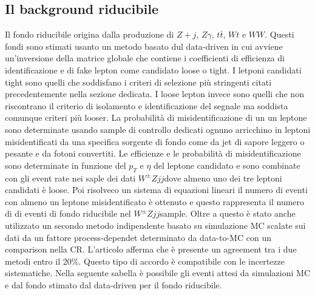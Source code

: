 \documentclass[11pt]{article}
\newcommand{\wzjj}{$W^\pm Z jj$}
\begin{document}
\subsection{Il background riducibile}
Il fondo riducibile origina dalla produzione di $Z+j$, $Z\gamma$, $t\bar{t}$, $Wt$ e $WW$. Questi fondi sono stimati usanto un metodo basato dul data-driven in cui avviene un'inversione della matrice globale che contiene i coefficienti di efficienza di identificazione e di fake lepton come candidato loose o tight. I letponi candidati tight sono quelli che soddisfano i criteri di selezione più stringenti citati precedentemente nella sezione dedicata. I loose lepton invece sono quelli che non riscontrano il criterio di isolamento e identificazione del segnale ma soddista comunque criteri più looser. La probabilità di misidentificazione di un un leptone sono determinate usando sample di controllo dedicati ognuno arricchino in leptoni misidentificati da una specifica sorgente di fondo come da jet di sapore leggero o pesante e da fotoni convertiti. Le efficienze e le probabilità di misidentificazione sono determinate in funzione del $p_T$ e $\eta$ del leptone candidato e sono combinate con gli event rate nei saple dei dati \wzjj dove almeno uno dei tre leptoni candidati è loose. Poi risolveco un sistema di equazioni lineari il numero di eventi con almeno un leptone misidentificato è ottenuto e questo rappresenta il numero di di eventi di fondo riducibile nel \wzjj sample. Oltre a questo è stato anche utilizzato un secondo metodo indipendente basato su simulazione MC scalate sui dati da un fattore  process-dependet determinato da data-to-MC con un comparison nella CR. L'articolo afferma che è presente un agreement tra i due metodi entro il 20\%. Questo tipo di accordo è compatibile con le incertezze sistematiche. Nella seguente sabella è possibile gli eventi attesi da simulazioni MC e dal fondo stimato dal data-driven per il fondo riducibile.
\end{document}
